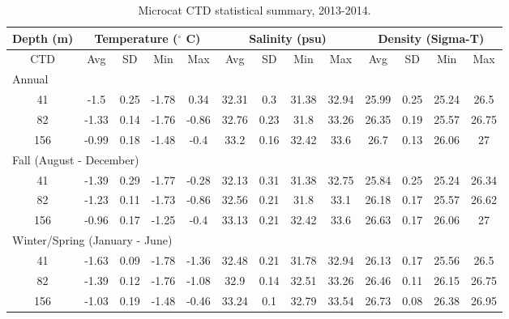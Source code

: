 \documentclass[12pt]{dforeport}
\begin{document}
\begin{landscape}
\begin{table}[ht] 
\centering
\caption[Microcat CTD statistical summary, 2013-2014]{Microcat CTD statistical summary, 2013-2014.} 
\label{t:ss_2013_2014}
\begin{tabular}{c | c c c c | c c c c | c c c c}
\toprule 
\multicolumn{1}{c}{\textbf{Depth (m)}} & \multicolumn{4}{c}{\textbf{Temperature ($^\circ$ C)}} & \multicolumn{4}{c}{\textbf{Salinity (psu)}} & \multicolumn{4}{c}{\textbf{Density (Sigma-T)}} \\\hline
\midrule
CTD & Avg & SD & Min & Max & Avg & SD & Min & Max & Avg & SD & Min & Max \\  
\midrule 
\multicolumn{13}{l}{Annual} \\
\midrule
41 & -1.5 & 0.25 & -1.78 & 0.34 & 32.31 & 0.3 & 31.38 & 32.94 & 25.99 & 0.25 & 25.24 & 26.5 \\
82 & -1.33 & 0.14 & -1.76 & -0.86 & 32.76 & 0.23 & 31.8 & 33.26 & 26.35 & 0.19 & 25.57 & 26.75 \\
156 & -0.99 & 0.18 & -1.48 & -0.4 & 33.2 & 0.16 & 32.42 & 33.6 & 26.7 & 0.13 & 26.06 & 27 \\
\midrule 
\multicolumn{13}{l}{Fall (August - December)} \\
\midrule
41 & -1.39 & 0.29 & -1.77 & -0.28 & 32.13 & 0.31 & 31.38 & 32.75 & 25.84 & 0.25 & 25.24 & 26.34 \\
82 & -1.23 & 0.11 & -1.73 & -0.86 & 32.56 & 0.21 & 31.8 & 33.1 & 26.18 & 0.17 & 25.57 & 26.62 \\
156 & -0.96 & 0.17 & -1.25 & -0.4 & 33.13 & 0.21 & 32.42 & 33.6 & 26.63 & 0.17 & 26.06 & 27 \\
\midrule  
\multicolumn{13}{l}{Winter/Spring (January - June)} \\
\midrule
41 & -1.63 & 0.09 & -1.78 & -1.36 & 32.48 & 0.21 & 31.78 & 32.94 & 26.13 & 0.17 & 25.56 & 26.5 \\
82 & -1.39 & 0.12 & -1.76 & -1.08 & 32.9 & 0.14 & 32.51 & 33.26 & 26.46 & 0.11 & 26.15 & 26.75 \\
156 & -1.03 & 0.19 & -1.48 & -0.46 & 33.24 & 0.1 & 32.79 & 33.54 & 26.73 & 0.08 & 26.38 & 26.95 \\
\bottomrule
\end{tabular}
\end{table}



\end{landscape}
\end{document}
